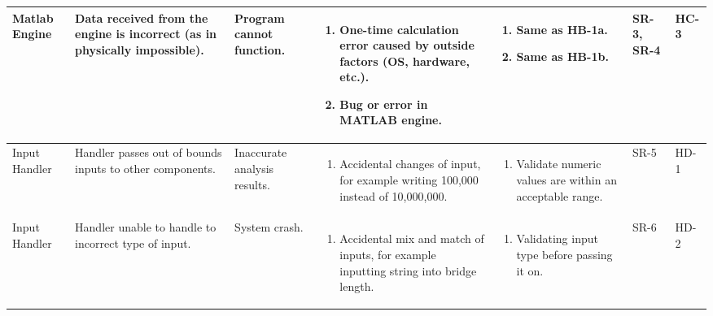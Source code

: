 \documentclass{article}
\begin{document}
\begin{landscape}
\begin{longtable}{|p{} | p{} | p{} | p{} | p{} | p{} | p{}|}
  \hline

  Matlab Engine & Data received from the engine is incorrect (as in physically impossible). &
  Program cannot function. &
  \begin{enumerate}[leftmargin=*, label={\alph*.}, itemsep=1pt, topsep=0pt, partopsep=0pt] 
    \item One-time calculation error caused by outside factors (OS, hardware, etc.).
    \item Bug or error in MATLAB engine.  
  \end{enumerate} &
  \begin{enumerate}[leftmargin=*, label={\alph*.}, itemsep=1pt, topsep=0pt, partopsep=0pt] 
    \item Same as HB-1a.
    \item Same as HB-1b.
  \end{enumerate}& 
  SR-3, SR-4 & HC-3 \\

  \hline

  Input Handler & Handler passes out of bounds inputs to other components. &
  Inaccurate analysis results. &
  \begin{enumerate}[leftmargin=*, label={\alph*.}, itemsep=1pt, topsep=0pt, partopsep=0pt] 
      \item Accidental changes of input, for example writing 100,000 instead of 10,000,000.
  \end{enumerate} &
  \begin{enumerate}[leftmargin=*, label={\alph*.}, itemsep=1pt, topsep=0pt, partopsep=0pt] 
    \item Validate numeric values are within an acceptable range.
  \end{enumerate} &
  SR-5 & HD-1 \\

  \hline

  Input Handler & Handler unable to handle to incorrect type of input. & System crash. &
  \begin{enumerate}[leftmargin=*, label={\alph*.}, itemsep=1pt, topsep=0pt, partopsep=0pt] 
      \item Accidental mix and match of inputs, for example inputting string into bridge length.
  \end{enumerate} &
  \begin{enumerate}[leftmargin=*, label={\alph*.}, itemsep=1pt, topsep=0pt, partopsep=0pt] 
    \item Validating input type before passing it on.
  \end{enumerate} &
  SR-6 & HD-2 \\


\end{longtable}
\end{landscape}
\end{document}
